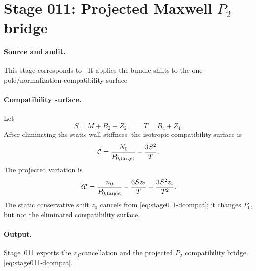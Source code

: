 \section[Stage 011]{Stage 011: Projected Maxwell \(P_2\) bridge}
\label{stage:011}


\paragraph{Source and audit.}
This stage corresponds to
.
It applies the bundle shifts to the one-pole/normalization compatibility
surface.

\paragraph{Compatibility surface.}
Let
\begin{equation}
\label{eq:stage011-compat-base}
S=M+B_2+Z_2,\qquad T=B_4+Z_4 .
\end{equation}
After eliminating the static wall stiffness, the isotropic compatibility
surface is
\begin{equation}
\label{eq:stage011-compat}
\mathcal C=\frac{N_0}{P_{0,\rm target}}-\frac{3S^2}{T}.
\end{equation}
The projected variation is
\begin{equation}
\label{eq:stage011-dcompat}
\delta\mathcal C
=\frac{n_0}{P_{0,\rm target}}
-\frac{6Sz_2}{T}
+\frac{3S^2z_4}{T^2}.
\end{equation}
The static conservative shift \(z_0\) cancels from
\eqref{eq:stage011-dcompat}; it changes \(P_0\), but not the eliminated
compatibility surface.

\paragraph{Output.}
Stage~011 exports the \(z_0\)-cancellation and the projected \(P_2\)
compatibility bridge \eqref{eq:stage011-dcompat}.
